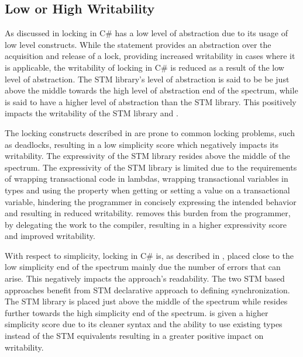 \subsection{Low or High Writability}
As discussed in  locking in C\# has a low level of abstraction due to its usage of low level constructs. While the  statement provides an abstraction over the acquisition and release of a lock, providing increased writability in cases where it is applicable, the writability of locking in C\# is reduced as a result of the low level of abstraction. The \ac{STM} library's level of abstraction is said to be be just above the middle towards the high level of abstraction end of the spectrum, while \stmname is said to have a higher level of abstraction than the \ac{STM} library. This positively impacts the writability of the \ac{STM} library and \stmname.

The locking constructs described in  are prone to common locking problems, such as deadlocks, resulting in a low simplicity score which negatively impacts its writability. The expressivity of the \ac{STM} library resides above the middle of the spectrum. The expressivity of the \ac{STM} library is limited due to the requirements of wrapping transactional code in lambdas, wrapping transactional variables in  types and using the  property when getting or setting a value on a transactional variable, hindering the programmer in concisely expressing the intended behavior and resulting in reduced writability. \stmname removes this burden from the programmer, by delegating the work to the compiler, resulting in a higher expressivity score and improved writability.

With respect to simplicity, locking in C\# is, as described in , placed close to the low simplicity end of the spectrum mainly due the number of errors that can arise. This negatively impacts the approach's readability. The two \ac{STM} based approaches benefit from \ac{STM} declarative approach to defining synchronization. The \ac{STM} library is placed just above the middle of the spectrum while \stmname resides further towards the high simplicity end of the spectrum. \stmname is given a higher simplicity score due to its cleaner syntax and the ability to use existing types instead of the \ac{STM} equivalents resulting in a greater positive impact on writability.

